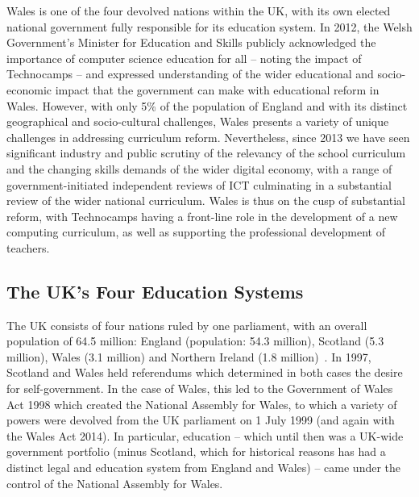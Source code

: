 Wales is one of the four devolved nations within the UK, with its own
elected national government fully responsible for its education
system.  In 2012, the Welsh Government's Minister for Education and
Skills publicly acknowledged the importance of computer science
education for all -- noting the impact of Technocamps -- and expressed
understanding of the wider educational and socio-economic impact that
the government can make with educational reform in Wales.  However,
with only 5\% of the population of England and with its distinct
geographical and socio-cultural challenges, Wales presents a variety
of unique challenges in addressing curriculum reform. Nevertheless,
since 2013 we have seen significant industry and public scrutiny of
the relevancy of the school curriculum and the changing skills demands
of the wider digital economy, with a range of government-initiated
independent reviews of ICT culminating in a substantial review of the
wider national curriculum. Wales is thus on the cusp of substantial
reform, with Technocamps having a front-line role in the development
of a new computing curriculum, as well as supporting the professional
development of teachers.

\subsection{The UK's Four Education Systems}

The UK consists of four nations ruled by one parliament, with an
overall population of 64.5 million: England (population: 54.3
million), Scotland (5.3 million), Wales (3.1 million) and Northern
Ireland (1.8 million)~\cite{onspop:2016}. In 1997, Scotland and Wales
held referendums which determined in both cases the desire for
self-government.  In the case of Wales, this led to the Government of
Wales Act 1998 which created the National Assembly for Wales, to which
a variety of powers were devolved from the UK parliament on 1 July
1999 (and again with the Wales Act 2014).  In particular, education --
which until then was a UK-wide government portfolio (minus Scotland,
which for historical reasons has had a distinct legal and education
system from England and Wales) -- came under the control of the
National Assembly for Wales.

